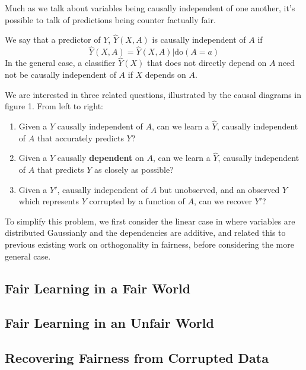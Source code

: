 \documentclass{article}
\begin{document}
Much as we talk about variables being causally independent of one
another, it's possible to talk of predictions being counter factually
fair.

We say that a predictor of $Y$, $\hat Y(X,A)$ is causally
independent of $A$ if 
%
\[ \hat Y(X,A)=\hat Y(X,A)|\text{do}(A=a) \] 
%
In the general case, a classifier $\hat Y (X)$ that does not directly
depend on $A$ need not be causally independent of $A$ if $X$ depends on $A$.

We are interested in three related questions, illustrated by the
causal diagrams in figure 1. From left to right:

\begin{enumerate}
\item Given a $Y$ causally independent of $A$, can we learn a $\hat Y$,
causally independent of $A$ that accurately predicts $Y$?
\item Given a $Y$ causally \textbf{dependent} on $A$, can we learn a $\hat Y$,
causally independent of $A$ that predicts $Y$ as closely as possible?
\item Given a $Y'$, causally independent of $A$ but unobserved, and an
observed $Y$ which represents $Y$ corrupted by a function of $A$,
can we recover $Y'$?
\end{enumerate}

To simplify this problem, we first consider the linear case in where
variables are distributed Gaussianly and the dependencies are
additive, and related this to previous existing work on orthogonality
in fairness, before considering the more general case.

\subsection{Fair Learning in a Fair World}
\label{sec-1-1}
\subsection{Fair Learning in an Unfair World}
\label{sec-1-2}
\subsection{Recovering Fairness from Corrupted Data}
\label{sec-1-3}




\end{document}
